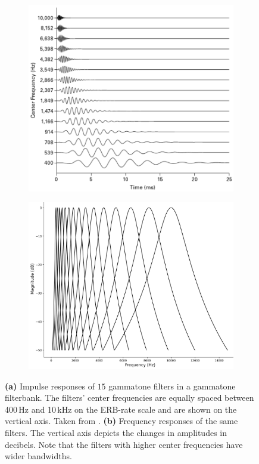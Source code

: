 \begin{figure}[t]
	\centering
	\begin{subfigure}{0.48\textwidth}
		\centering
		\includegraphics[width=\linewidth]{include/gammatone_filterbank_impulse_response}
		\caption{}
		\label{img:gammatone_filterbank_IR}
	\end{subfigure}%
	\begin{subfigure}{0.52\textwidth}
		\centering
		\includegraphics[width=\linewidth]{include/gammatone_filterbank_frequency_response}
		\caption{}
		\label{img:gammatone_filterbank_FR}
	\end{subfigure}
	\caption[Gammatone filterbank impulse and frequency responses]{\textbf{(a)} Impulse responses of $15$ gammatone filters in a gammatone filterbank. The filters' center frequencies are equally spaced between 400\,Hz and 10\,kHz on the ERB-rate scale and are shown on the vertical axis. Taken from \cite{Schnupp2011}. \textbf{(b)} Frequency responses of the same filters. The vertical axis depicts the changes in amplitudes in decibels. Note that the filters with higher center frequencies have wider bandwidths.}
	\label{img:gammatone_filterbank}
\end{figure}

